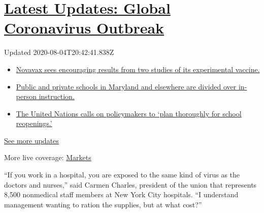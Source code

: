 \hypertarget{latest-updates-global-coronavirus-outbreak}{%
\section{\texorpdfstring{\href{https://www.nytimes.com/2020/08/04/world/coronavirus-cases.html?action=click\&pgtype=Article\&state=default\&region=MAIN_CONTENT_1\&context=storylines_live_updates}{Latest
Updates: Global Coronavirus
Outbreak}}{Latest Updates: Global Coronavirus Outbreak}}\label{latest-updates-global-coronavirus-outbreak}}

Updated 2020-08-04T20:42:41.838Z

\begin{itemize}
\tightlist
\item
  \href{https://www.nytimes.com/2020/08/04/world/coronavirus-cases.html?action=click\&pgtype=Article\&state=default\&region=MAIN_CONTENT_1\&context=storylines_live_updates\#link-1228a480}{Novavax
  sees encouraging results from two studies of its experimental
  vaccine.}
\item
  \href{https://www.nytimes.com/2020/08/04/world/coronavirus-cases.html?action=click\&pgtype=Article\&state=default\&region=MAIN_CONTENT_1\&context=storylines_live_updates\#link-4825b93}{Public
  and private schools in Maryland and elsewhere are divided over
  in-person instruction.}
\item
  \href{https://www.nytimes.com/2020/08/04/world/coronavirus-cases.html?action=click\&pgtype=Article\&state=default\&region=MAIN_CONTENT_1\&context=storylines_live_updates\#link-50f7386d}{The
  United Nations calls on policymakers to `plan thoroughly for school
  reopenings.'}
\end{itemize}

\href{https://www.nytimes.com/2020/08/04/world/coronavirus-cases.html?action=click\&pgtype=Article\&state=default\&region=MAIN_CONTENT_1\&context=storylines_live_updates}{See
more updates}

More live coverage:
\href{https://www.nytimes.com/live/2020/08/04/business/stock-market-today-coronavirus?action=click\&pgtype=Article\&state=default\&region=MAIN_CONTENT_1\&context=storylines_live_updates}{Markets}

``If you work in a hospital, you are exposed to the same kind of virus
as the doctors and nurses,'' said Carmen Charles, president of the union
that represents 8,500 nonmedical staff members at New York City
hospitals. ``I understand management wanting to ration the supplies, but
at what cost?''

